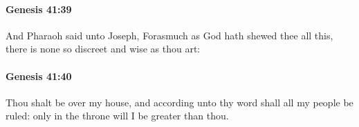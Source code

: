 		\paragraph{Genesis 41:39} %
			\label{GENESIS-41-39}

			And Pharaoh said unto Joseph, Forasmuch as God hath shewed thee all this, there is none so discreet and wise as thou art:


		\paragraph{Genesis 41:40} %
			\label{GENESIS-41-40}

			Thou shalt be over my house, and according unto thy word shall all my people be ruled: only in the throne will I be greater than thou.


